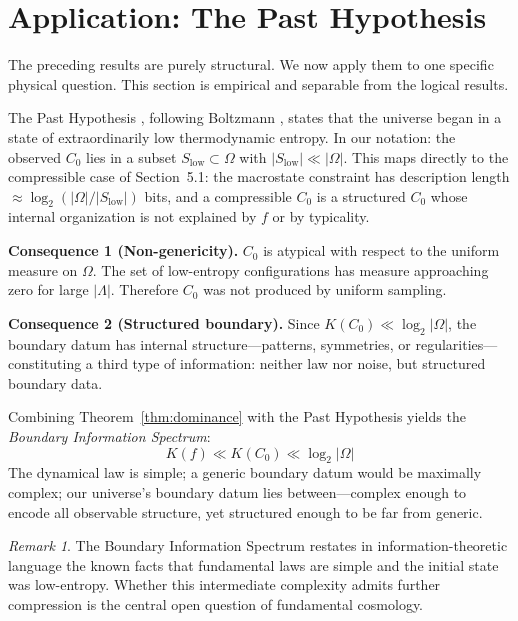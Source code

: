 \documentclass[12pt]{article}
\theoremstyle{plain}
\theoremstyle{definition}
\theoremstyle{remark}
\newtheorem{remark}[theorem]{Remark}
\newcommand{\Lattice}{\Lambda}
\begin{document}
\section{Application: The Past Hypothesis}

The preceding results are purely structural. We now apply them to one specific physical question. This section is empirical and separable from the logical results.

The Past Hypothesis \cite{albert2000}, following Boltzmann \cite{boltzmann1877}, states that the universe began in a state of extraordinarily low thermodynamic entropy. In our notation: the observed $C_0$ lies in a subset $S_{\mathrm{low}} \subset \Omega$ with $|S_{\mathrm{low}}| \ll |\Omega|$. This maps directly to the compressible case of Section~5.1: the macrostate constraint has description length $\approx \log_2(|\Omega|/|S_{\mathrm{low}}|)$ bits, and a compressible $C_0$ is a structured $C_0$ whose internal organization is not explained by $f$ or by typicality.

\medskip
\noindent\textbf{Consequence 1 (Non-genericity).} $C_0$ is atypical with respect to the uniform measure on $\Omega$. The set of low-entropy configurations has measure approaching zero for large $|\Lattice|$. Therefore $C_0$ was not produced by uniform sampling.

\medskip
\noindent\textbf{Consequence 2 (Structured boundary).} Since $K(C_0) \ll \log_2|\Omega|$, the boundary datum has internal structure---patterns, symmetries, or regularities---constituting a third type of information: neither law nor noise, but structured boundary data.

\medskip
Combining Theorem~\ref{thm:dominance} with the Past Hypothesis yields the \emph{Boundary Information Spectrum}:
\begin{equation}
K(f) \ll K(C_0) \ll \log_2|\Omega|
\end{equation}
The dynamical law is simple; a generic boundary datum would be maximally complex; our universe's boundary datum lies between---complex enough to encode all observable structure, yet structured enough to be far from generic.

\begin{remark}
The Boundary Information Spectrum restates in information-theoretic language the known facts that fundamental laws are simple and the initial state was low-entropy. Whether this intermediate complexity admits further compression is the central open question of fundamental cosmology.
\end{remark}
\end{document}
